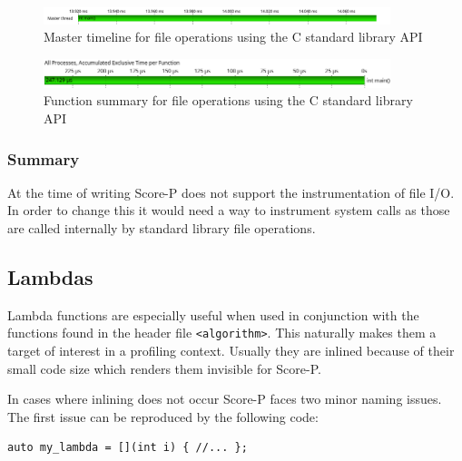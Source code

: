 \begin{figure}[htbp]
	\begin{center}
		\includegraphics[width=0.9\textwidth]{img/scorep_c_io_timeline.png}
		\caption{Master timeline for file operations using the C standard library API}
		\label{scorep:c_io_timeline}
	\end{center}
\end{figure}

\begin{figure}[htbp]
	\begin{center}
		\includegraphics[width=0.9\textwidth]{img/scorep_text_fstream_summary.png}
		\caption{Function summary for file operations using the C standard library API}
		\label{scorep:c_io_summary}
	\end{center}
\end{figure}

\subsubsection{Summary}

At the time of writing Score-P does not support the instrumentation of file I/O. In order to change this it would need a way to instrument system calls as those are called internally by standard library file operations.

\subsection{Lambdas}

Lambda functions are especially useful when used in conjunction with the functions found in the header file \texttt{<algorithm>}. This naturally makes them a target of interest in a profiling context. Usually they are inlined because of their small code size which renders them invisible for Score-P.

In cases where inlining does not occur Score-P faces two minor naming issues. The first issue can be reproduced by the following code:

\begin{lstlisting}
auto my_lambda = [](int i) { //... };
\end{lstlisting}

